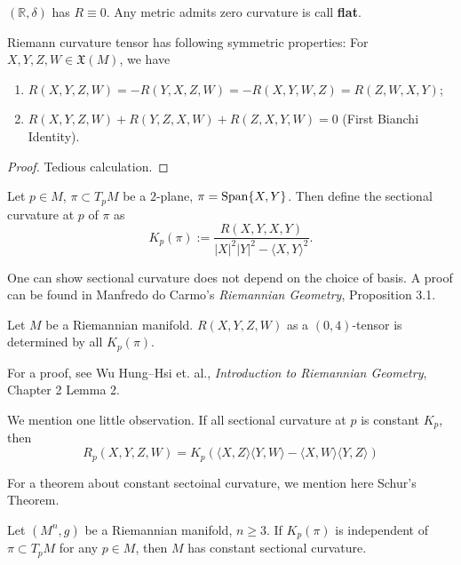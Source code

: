 \begin{eg}
    $(\mathbb{R},\delta)$ has $R\equiv 0$.
    Any metric admits zero curvature is call \textbf{flat}.
\end{eg}

\begin{prop}
    Riemann curvature tensor has following symmetric properties: For $X,Y,Z,W\in\mathfrak{X}(M)$, we have
    \begin{enumerate}[(1)]
        \item $R(X,Y,Z,W)=-R(Y,X,Z,W)=-R(X,Y,W,Z)=R(Z,W,X,Y)$;
        \item $R(X,Y,Z,W)+R(Y,Z,X,W)+R(Z,X,Y,W)=0$ (First Bianchi Identity).
    \end{enumerate}
\end{prop}
\begin{proof}
    Tedious calculation.
\end{proof}

\begin{defn}
    Let $p\in M$, $\pi\subset T_pM$ be a $2$-plane, $\pi=\operatorname{Span}\{X,Y\}$.
    Then define the sectional curvature at $p$ of $\pi$ as
    \[K_p(\pi):=\frac{R(X,Y,X,Y)}{|X|^2|Y|^2-\langle X,Y\rangle^2}.\]
\end{defn}

\begin{rem}
    One can show sectional curvature does not depend on the choice of basis.
    A proof can be found in Manfredo do Carmo's \emph{Riemannian Geometry}, Proposition 3.1.
\end{rem}

\begin{prop}
    Let $M$ be a Riemannian manifold.
    $R(X,Y,Z,W)$ as a $(0,4)$-tensor is determined by all $K_p(\pi)$.
\end{prop}
For a proof, see Wu Hung--Hsi et. al., \emph{Introduction to Riemannian Geometry}, Chapter 2 Lemma 2.

We mention one little observation.
If all sectional curvature at $p$ is constant $K_p$, then
\[R_p(X,Y,Z,W)=K_p(\langle X,Z\rangle\langle Y,W\rangle-\langle X,W\rangle\langle Y,Z\rangle)\]

For a theorem about constant sectoinal curvature, we mention here Schur's Theorem.
\begin{thm}[Schur]
    Let $(M^n,g)$ be a Riemannian manifold, $n\geq 3$.
    If $K_p(\pi)$ is independent of $\pi\subset T_pM$ for any $p\in M$, then $M$ has constant sectional curvature.
\end{thm}

